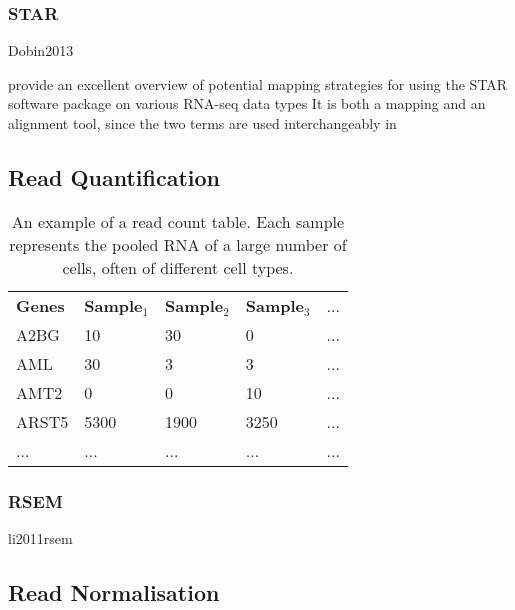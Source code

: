 
\subsubsection{STAR}
Dobin2013

\cite{dobin2015mapping} provide an excellent overview of potential mapping strategies for using the STAR software package on various RNA-seq data types
It is both a mapping and an alignment tool, since the two terms are used interchangeably in \cite{dobin2015mapping}

\subsection{Read Quantification}


\begin{table}[h]
\centering
\caption{An example of a read count table. Each sample represents the pooled RNA of a large number of cells, often of different cell types.}
\label{tab:read_count}
\begin{tabular}{lllll}
\textbf{Genes} & \textbf{Sample$_{1}$} & \textbf{Sample$_{2}$} & \textbf{Sample$_{3}$} & ...  \\
A2BG  & 10      & 30      & 0       & ...  \\
AML   & 30      & 3       & 3       & ...  \\
AMT2  & 0       & 0       & 10      & ...  \\
ARST5 & 5300    & 1900    & 3250    & ...  \\
...   & ...     & ...     & ...     & ... 
\end{tabular}
\end{table}

\subsubsection{RSEM}
li2011rsem

\subsection{Read Normalisation}

